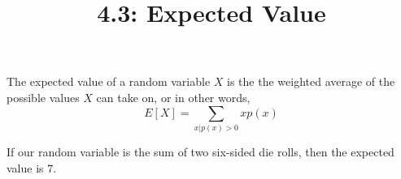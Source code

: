 \documentclass{article}
\title{4.3: Expected Value}
\begin{document}
\maketitle
\begin{definition}
The expected value of a random variable $X$ is the the weighted average of the possible values $X$ can take on, or in other words, $$E[X] = \sum_{x \vert p(x)>0} x p(x)$$
\end{definition}

\begin{example}
If our random variable is the sum of two six-sided die rolls, then the expected value is $7$. 
\end{example}
\end{document}
